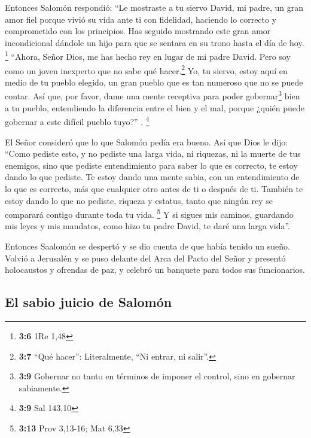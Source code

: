  Entonces Salomón respondió: ``Le mostraste a tu siervo
David, mi padre, un gran amor fiel porque vivió su vida ante ti con
fidelidad, haciendo lo correcto y comprometido con los principios. Has
seguido mostrando este gran amor incondicional dándole un hijo para que
se sentara en su trono hasta el día de hoy. \footnote{\textbf{3:6} 1Re
  1,48}  ``Ahora, Señor Dios, me has hecho rey en lugar de
mi padre David. Pero soy como un joven inexperto que no sabe qué
hacer.\footnote{\textbf{3:7} ``Qué hacer'': Literalmente, ``Ni entrar,
  ni salir''.}  Yo, tu siervo, estoy aquí en medio de tu
pueblo elegido, un gran pueblo que es tan numeroso que no se puede
contar.  Así que, por favor, dame una mente receptiva para
poder gobernar\footnote{\textbf{3:9} Gobernar no tanto en términos de
  imponer el control, sino en gobernar sabiamente.} bien a tu pueblo,
entendiendo la diferencia entre el bien y el mal, porque ¿quién puede
gobernar a este difícil pueblo tuyo?'' . \footnote{\textbf{3:9} Sal
  143,10}

 El Señor consideró que lo que Salomón pedía era bueno.
 Así que Dios le dijo: ``Como pediste esto, y no pediste
una larga vida, ni riquezas, ni la muerte de tus enemigos, sino que
pediste entendimiento para saber lo que es correcto,  te
estoy dando lo que pediste. Te estoy dando una mente sabia, con un
entendimiento de lo que es correcto, más que cualquier otro antes de ti
o después de ti.  También te estoy dando lo que no
pediste, riqueza y estatus, tanto que ningún rey se comparará contigo
durante toda tu vida. \footnote{\textbf{3:13} Prov 3,13-16; Mat 6,33}
 Y si sigues mis caminos, guardando mis leyes y mis
mandatos, como hizo tu padre David, te daré una larga vida''.

 Entonces Saalomón se despertó y se dio cuenta de que
había tenido un sueño. Volvió a Jerusalén y se puso delante del Arca del
Pacto del Señor y presentó holocaustos y ofrendas de paz, y celebró un
banquete para todos sus funcionarios.

\hypertarget{el-sabio-juicio-de-salomuxf3n}{%
\subsection{El sabio juicio de
Salomón}\label{el-sabio-juicio-de-salomuxf3n}}

